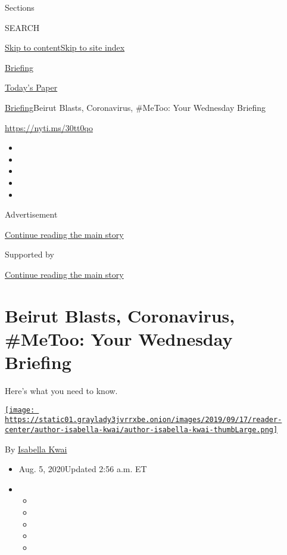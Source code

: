 Sections

SEARCH

\protect\hyperlink{site-content}{Skip to
content}\protect\hyperlink{site-index}{Skip to site index}

\href{https://www.nytimes3xbfgragh.onion/interactive/2018/briefing/global-morning-briefing-newsletter-signup.html}{Briefing}

\href{https://myaccount.nytimes3xbfgragh.onion/auth/login?response_type=cookie\&client_id=vi}{}

\href{https://www.nytimes3xbfgragh.onion/section/todayspaper}{Today's
Paper}

\href{/interactive/2018/briefing/global-morning-briefing-newsletter-signup.html}{Briefing}\textbar{}Beirut
Blasts, Coronavirus, \#MeToo: Your Wednesday Briefing

\url{https://nyti.ms/30tt0qo}

\begin{itemize}
\item
\item
\item
\item
\item
\end{itemize}

Advertisement

\protect\hyperlink{after-top}{Continue reading the main story}

Supported by

\protect\hyperlink{after-sponsor}{Continue reading the main story}

\hypertarget{beirut-blasts-coronavirus-metoo-your-wednesday-briefing}{%
\section{Beirut Blasts, Coronavirus, \#MeToo: Your Wednesday
Briefing}\label{beirut-blasts-coronavirus-metoo-your-wednesday-briefing}}

Here's what you need to know.

\href{https://www.nytimes3xbfgragh.onion/by/isabella-kwai}{\texttt{[image: https://static01.graylady3jvrrxbe.onion/images/2019/09/17/reader-center/author-isabella-kwai/author-isabella-kwai-thumbLarge.png]}}

By \href{https://www.nytimes3xbfgragh.onion/by/isabella-kwai}{Isabella
Kwai}

\begin{itemize}
\item
  Aug. 5, 2020Updated 2:56 a.m. ET
\item
  \begin{itemize}
  \item
  \item
  \item
  \item
  \item
  \end{itemize}
\end{itemize}

